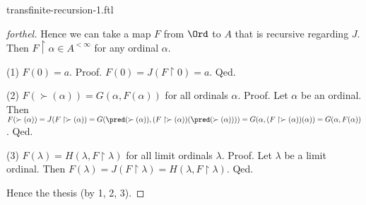 \documentclass{naproche-library}
\begin{document}
\begin{smodule}{transfinite-recursion-1.ftl}
\begin{proof}[forthel]
    Hence we can take a map $F$ from $\Ord$ to $A$ that is recursive regarding $J$.
    Then $F \restriction \alpha \in A^{< \infty}$ for any ordinal $\alpha$.

    (1) $F(0) = a$. \newline
    Proof.
      $F(0)
        = J(F \restriction 0)
        = a$.
    Qed.

    (2) $F(\succ(\alpha)) = G(\alpha, F(\alpha))$ for all ordinals $\alpha$. \newline
    Proof.
      Let $\alpha$ be an ordinal.
      Then $F(\succ(\alpha))
        = J(F \restriction \succ(\alpha))
        = G(\pred(\succ(\alpha)), (F \restriction \succ(\alpha))(\pred(\succ(\alpha))))
        = G(\alpha, (F \restriction \succ(\alpha))(\alpha))
        = G(\alpha, F(\alpha))$.
    Qed.

    (3) $F(\lambda) = H(\lambda, F \restriction \lambda)$ for all limit ordinals $\lambda$. \newline
    Proof.
      Let $\lambda$ be a limit ordinal.
      Then $F(\lambda)
        = J(F \restriction \lambda)
        = H(\lambda, F \restriction \lambda)$.
    Qed.

    Hence the thesis (by 1, 2, 3).
  \end{proof}
\end{smodule}
\end{document}
